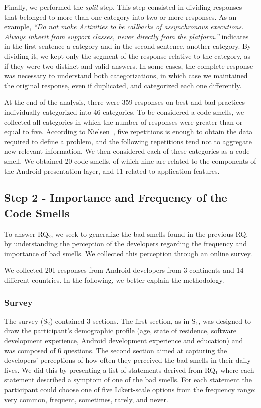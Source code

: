Finally, we performed the \textit {split} step. This step consisted in dividing responses that belonged to more than one category into two or more responses.
As an example, \textit{``Do not make Activities to be callbacks of assynchronous executions. Always inherit from support classes, never directly from the platform.''} indicates in the first sentence a category and in the second sentence, another category. By dividing it, we kept only the segment of the response relative to the category, as if they were two distinct and valid answers. In some cases, the complete response was necessary to understand both categorizations, in which case we maintained the original response, even if duplicated, and categorized each one differently.

At the end of the analysis, there were 359 responses on best and bad practices individually categorized into 46 categories. 
To be considered a code smells, we collected all categories in which the number
of responses were greater than or equal to five.
According to Nielsen~\cite{NielsenMagicNumber:00}, five repetitions is enough to obtain the data required to define a problem, and the following repetitions tend not to aggregate new relevant information. We then considered each of these categories as a code smell.
We obtained 20 code smells, of which nine are related to the components of the Android presentation layer, and 11 related to application features.

\subsection{Step 2 - Importance and Frequency of the Code Smells}

To answer RQ$_2$, we seek to generalize the bad smells 
found in the previous RQ, by understanding the perception of the developers regarding the frequency and importance of bad smells. We collected this perception through an online survey.

We collected 201 responses from Android developers from 3 continents and 14 different countries. In the following, we better explain the methodology.

\subsubsection{Survey}
\label{etapa-2-questionario}

The survey (S$_2$) contained 3 sections. 
The first section, as in S$_1$, was designed to draw the participant's demographic profile 
(age, state of residence, software development experience, Android development experience and education) and was composed of 6 questions.
The second section aimed at capturing the developers' perceptions of how often they perceived the bad smells in their daily lives. We did this by presenting a list of statements derived from RQ$_1$ where each statement described a symptom of one of the bad smells. For each statement the participant could choose one of five Likert-scale options from the frequency range: very common, frequent, sometimes, rarely, and never.


